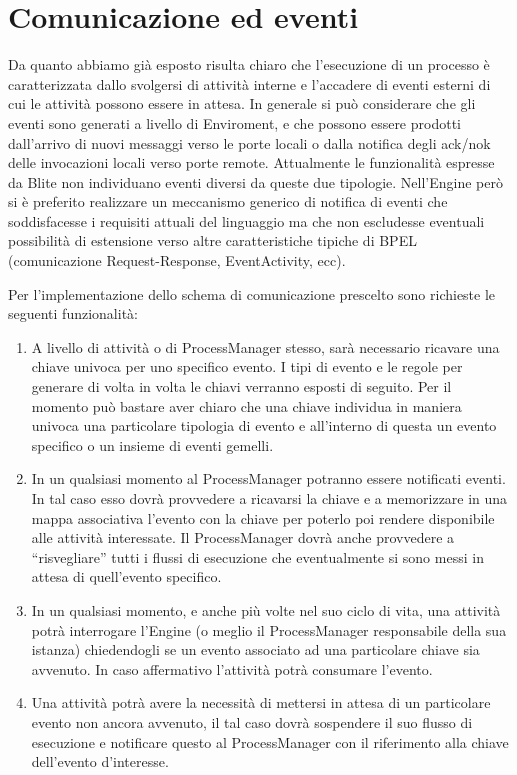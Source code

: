 \section{Comunicazione ed eventi}
\label{sec:comevent}
Da quanto abbiamo già esposto risulta chiaro che l'esecuzione di un processo \`e
caratterizzata dallo svolgersi di attività interne e l'accadere di eventi
esterni di cui le attività possono essere in attesa. In generale si può
considerare che gli eventi sono generati a livello di Enviroment, e che possono
essere prodotti dall'arrivo di nuovi messaggi verso le porte locali o
dalla notifica degli ack/nok delle invocazioni locali
verso porte remote. Attualmente le funzionalità espresse da Blite non
individuano eventi diversi da queste due tipologie. Nell'Engine però si \`e
preferito realizzare un meccanismo generico di notifica di eventi che
soddisfacesse i requisiti attuali del linguaggio ma che non escludesse eventuali
possibilità di estensione verso altre caratteristiche tipiche di BPEL
(comunicazione Request-Response, EventActivity, ecc).

Per l'implementazione dello schema di comunicazione prescelto sono richieste
le seguenti funzionalità:

\begin{enumerate}
  \item A livello di attività o di ProcessManager stesso,
  sarà necessario ricavare una chiave univoca per uno specifico 
  evento. I tipi di evento e le regole per generare di volta in
  volta le chiavi verranno esposti di seguito. Per il momento può bastare aver
  chiaro che una chiave individua in maniera univoca una particolare tipologia di evento e all'interno di questa un evento specifico o un insieme
  di eventi gemelli.
  
  \item In un qualsiasi momento al ProcessManager potranno essere notificati
  eventi. In tal caso esso dovrà provvedere a ricavarsi la chiave e a
  memorizzare in una mappa associativa l'evento con la chiave per poterlo poi
  rendere disponibile alle attività interessate. Il ProcessManager dovrà anche
  provvedere a ``risvegliare'' tutti i flussi di esecuzione che
  eventualmente si sono messi in attesa di quell'evento specifico.
   
  \item In un qualsiasi momento, e anche più volte nel suo ciclo di vita, una
  attività potrà interrogare l'Engine (o meglio il ProcessManager responsabile
  della sua istanza) chiedendogli se un evento associato ad una particolare
  chiave sia avvenuto. In caso affermativo l'attività potrà consumare l'evento.

  \item Una attività potrà avere la necessità di mettersi in attesa di un
  particolare evento non ancora avvenuto, il tal caso dovrà sospendere il
  suo flusso di esecuzione e notificare questo al ProcessManager
  con il riferimento alla chiave dell'evento d'interesse. 
\end{enumerate}

